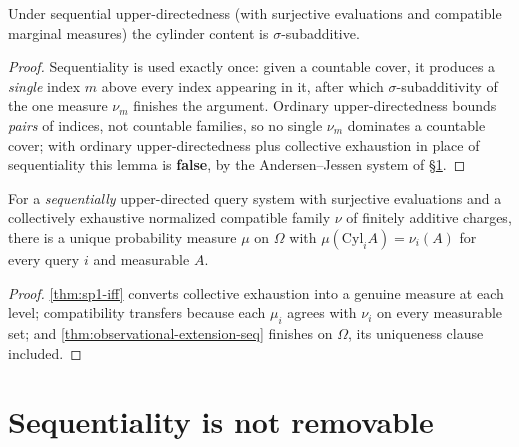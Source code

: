 \begin{lemma}
\label{lem:cylgen-sigma-subadd}
\leanok
{}
Under sequential upper-directedness (with surjective evaluations and
compatible marginal measures) the cylinder content is $\sigma$-subadditive.
\end{lemma}

\begin{proof}
\leanok
Sequentiality is used exactly once: given a countable cover, it produces a
\emph{single} index $m$ above every index appearing in it, after which
$\sigma$-subadditivity of the one measure $\nu_m$ finishes the argument.
Ordinary upper-directedness bounds \emph{pairs} of indices, not countable
families, so no single $\nu_m$ dominates a countable cover; with ordinary
upper-directedness plus collective exhaustion in place of sequentiality this
lemma is \textbf{false}, by the Andersen--Jessen system of
\S\ref{sec:sequentiality}.
\end{proof}

\begin{theorem}
\label{thm:stone-observational-extension}
\leanok
{}
For a \emph{sequentially} upper-directed query system with surjective
evaluations and a collectively exhaustive normalized compatible family
$\nu$ of finitely additive charges, there is a unique
probability measure $\mu$ on $\Omega$ with
$\mu(\mathrm{Cyl}_i A) = \nu_i(A)$ for every query $i$ and measurable $A$.
\end{theorem}

\begin{proof}
\leanok
{}
\ref{thm:sp1-iff} converts collective exhaustion into a genuine measure at each
level; compatibility transfers because each $\mu_i$ agrees with $\nu_i$ on every
measurable set; and \ref{thm:observational-extension-seq} finishes on $\Omega$,
its uniqueness clause included.
\end{proof}

\section{Sequentiality is not removable}
\label{sec:sequentiality}

